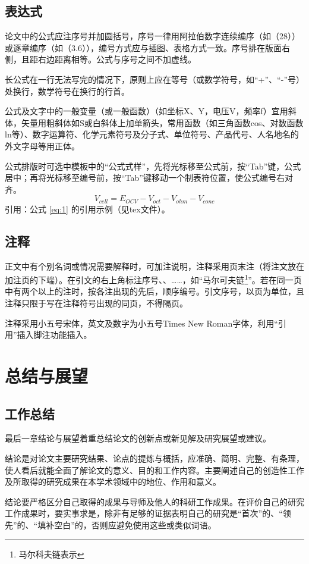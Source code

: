 \documentclass{seuthesis-2022}
\begin{document}
\section{表达式}
论文中的公式应注序号并加圆括号，序号一律用阿拉伯数字连续编序（如（28））或逐章编序（如（3.6）），编号方式应与插图、表格方式一致。序号排在版面右侧，且距右边距离相等。公式与序号之间不加虚线。

长公式在一行无法写完的情况下，原则上应在等号（或数学符号，如“+”、“-”号）处换行，数学符号在换行的行首。

公式及文字中的一般变量（或一般函数）（如坐标X、Y，电压V，频率f）宜用斜体，矢量用粗斜体如S或白斜体上加单箭头，常用函数（如三角函数cos、对数函数ln等）、数字运算符、化学元素符号及分子式、单位符号、产品代号、人名地名的外文字母等用正体。

公式排版时可选中模板中的“公式式样”，先将光标移至公式前，按“Tab”键，公式居中；再将光标移至编号前，按“Tab”键移动一个制表符位置，使公式编号右对齐。
\begin{equation}\label{eq:1}
  V_{cell}=E_{OCV}-V_{oct}-V_{ohm}-V_{conc}
  \end{equation}
引用：公式 \eqref{eq:1} 的引用示例（见tex文件）。

  
\section{注释}
正文中有个别名词或情况需要解释时，可加注说明，注释采用页末注（将注文放在加注页的下端）。在引文的右上角标注序号、、……，如“马尔可夫链\footnote{马尔科夫链表示}”。若在同一页中有两个以上的注时，按各注出现的先后，顺序编号。引文序号，以页为单位，且注释只限于写在注释符号出现的同页，不得隔页。

注释采用小五号宋体，英文及数字为小五号Times New Roman字体，利用“引用”插入脚注功能插入。

\chapter{总结与展望}
\section{工作总结}
最后一章结论与展望着重总结论文的创新点或新见解及研究展望或建议。

结论是对论文主要研究结果、论点的提炼与概括，应准确、简明、完整、有条理，使人看后就能全面了解论文的意义、目的和工作内容。主要阐述自己的创造性工作及所取得的研究成果在本学术领域中的地位、作用和意义。

结论要严格区分自己取得的成果与导师及他人的科研工作成果。在评价自己的研究工作成果时，要实事求是，除非有足够的证据表明自己的研究是“首次”的、“领先”的、“填补空白”的，否则应避免使用这些或类似词语。
\end{document}
